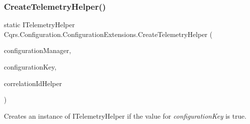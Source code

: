 \subsubsection{\texorpdfstring{Create\+Telemetry\+Helper()}{CreateTelemetryHelper()}\hspace{0.1cm}{\footnotesize\ttfamily [2/2]}}
{\footnotesize\ttfamily static I\+Telemetry\+Helper Cqrs.\+Configuration.\+Configuration\+Extensions.\+Create\+Telemetry\+Helper (\begin{DoxyParamCaption}\item[{this \hyperlink{interfaceCqrs_1_1Configuration_1_1IConfigurationManager}{I\+Configuration\+Manager}}]{configuration\+Manager,  }\item[{string}]{configuration\+Key,  }\item[{I\+Correlation\+Id\+Helper}]{correlation\+Id\+Helper }\end{DoxyParamCaption})\hspace{0.3cm}{\ttfamily [static]}}



Creates an instance of I\+Telemetry\+Helper if the value for {\itshape configuration\+Key}  is true. 

